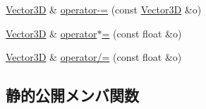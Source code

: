 \begin{DoxyCompactItemize}
\item 
\mbox{\hyperlink{struct_effekseer_1_1_vector3_d}{Vector3D}} \& \mbox{\hyperlink{struct_effekseer_1_1_vector3_d_a41737c64743b0f001d1a0ae502d6c0d9}{operator-\/=}} (const \mbox{\hyperlink{struct_effekseer_1_1_vector3_d}{Vector3D}} \&o)
\item 
\mbox{\hyperlink{struct_effekseer_1_1_vector3_d}{Vector3D}} \& \mbox{\hyperlink{struct_effekseer_1_1_vector3_d_a37cdddecb129f14208169a84b4fea773}{operator$\ast$=}} (const float \&o)
\item 
\mbox{\hyperlink{struct_effekseer_1_1_vector3_d}{Vector3D}} \& \mbox{\hyperlink{struct_effekseer_1_1_vector3_d_a611f802ffd7514b3f3a6b99936d371fc}{operator/=}} (const float \&o)
\end{DoxyCompactItemize}
\subsection*{静的公開メンバ関数}
